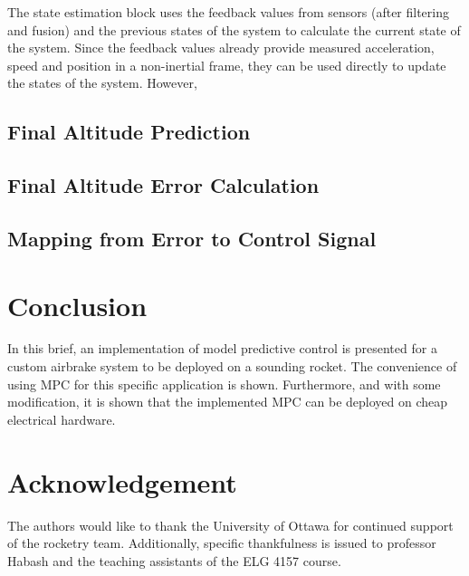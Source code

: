 \documentclass[conference, letterpaper]{IEEEtran}
\begin{document}
The state estimation block uses the feedback values from sensors (after filtering and fusion)
and the previous states of the system to calculate the current state of the system.
Since the feedback values already provide measured acceleration, speed and position
in a non-inertial frame, they can be used directly to update the states of the system.
However, 


\subsection{Final Altitude Prediction}

\subsection{Final Altitude Error Calculation}

\subsection{Mapping from Error to Control Signal}

\section{Conclusion}

In this brief, an implementation of model predictive control is presented for a
custom airbrake system to be deployed on a sounding rocket. The convenience of
using MPC for this specific application is shown. Furthermore, and with some
modification, it is shown that the implemented MPC can be deployed on cheap electrical
hardware.

\section{Acknowledgement}

The authors would like to thank the University of Ottawa for continued support of the
rocketry team. Additionally, specific thankfulness is issued to professor Habash and
the teaching assistants of the ELG 4157 course.



\end{document}
